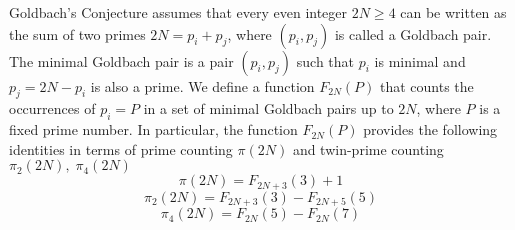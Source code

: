 Goldbach's Conjecture assumes that every even integer $2N \geq 4$ can be written as the sum of two primes
$2N = p_i + p_j$, where $(p_i, p_j)$ is called a Goldbach pair.
The minimal Goldbach pair is a pair $(p_i, p_j)$ such that $p_i$ is minimal and $p_j = 2N - p_i$ is also a prime.
We define a function $F_{2N}(P)$ that counts the occurrences of $p_i = P$ in a set of minimal Goldbach pairs
up to $2N$, where $P$ is a fixed prime number.
In particular, the function $F_{2N}(P)$ provides the following identities in terms of prime counting $\pi(2N)$ and
twin-prime counting $\pi_2(2N), \; \pi_4(2N)$
\[
    \pi(2N) = F_{2N+3}(3) + 1
\]
\[
    \pi_2(2N) = F_{2N+3}(3) - F_{2N+5}(5)
\]
\[
    \pi_4(2N) = F_{2N}(5) - F_{2N}(7)
\]
